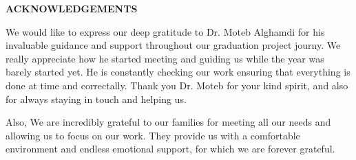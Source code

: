 \newpage

\setcounter{page}{2}
\renewcommand{\thepage}{\roman{page}}


\begin{center}
    \Large\textbf{ACKNOWLEDGEMENTS}
\end{center}
\vspace{6pt}

We would like to express our deep gratitude to Dr. Moteb Alghamdi for his invaluable guidance and support throughout our graduation project journy. We really appreciate how he started meeting and guiding us while the year was barely started yet. He is constantly checking our work ensuring that everything is done at time and correctally. Thank you Dr. Moteb for your kind spirit, and also for always staying in touch and helping us.


Also, We are incredibly grateful to our families for meeting all our needs and allowing us to focus on our work. They provide us with a comfortable environment and endless emotional support, for which we are forever grateful.
